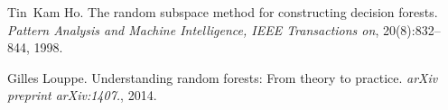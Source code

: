 
\begin{DoxyDescription}
\item[\label{_CITEREF_ho1998random}%
\mbox{[}1\mbox{]}]Tin~Kam Ho. The random subspace method for constructing decision forests. {\itshape Pattern Analysis and Machine Intelligence, I\-E\-E\-E Transactions on}, 20(8)\-:832--844, 1998.


\item[\label{_CITEREF_louppe2014understanding}%
\mbox{[}2\mbox{]}]Gilles Louppe. Understanding random forests\-: From theory to practice. {\itshape ar\-Xiv preprint ar\-Xiv\-:1407.}, 2014.


\end{DoxyDescription}
